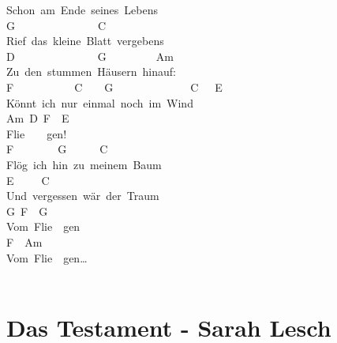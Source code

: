 \documentclass[]{book}
\let\stdsection\section
\renewcommand\section{\clearpage\stdsection}
\begin{document}
Schon~am~Ende~seines~Lebens\\
G~~~~~~~~~~~~~~~C\\
Rief~das~kleine~Blatt~vergebens\\
D~~~~~~~~~~~~~~~G~~~~~~~~~Am\\
Zu~den~stummen~Häusern~hinauf:\\
F~~~~~~~~~~~C~~~~G~~~~~~~~~~~~~~C~~~E\\
Könnt~ich~nur~einmal~noch~im~Wind\\
Am~D~F~~E\\
Flie~~~~gen!\\
F~~~~~~~~G~~~~~~C\\
Flög~ich~hin~zu~meinem~Baum\\
\hspace*{0.333em}\hspace*{0.333em}\hspace*{0.333em}\hspace*{0.333em}\hspace*{0.333em}\hspace*{0.333em}\hspace*{0.333em}\hspace*{0.333em}E~~~~~C\\
Und~vergessen~wär~der~Traum\\
\hspace*{0.333em}\hspace*{0.333em}\hspace*{0.333em}\hspace*{0.333em}\hspace*{0.333em}G~F~~G\\
Vom~Flie~~gen\\
\hspace*{0.333em}\hspace*{0.333em}\hspace*{0.333em}\hspace*{0.333em}\hspace*{0.333em}\hspace*{0.333em}\hspace*{0.333em}F~~Am\\
Vom~Flie~~gen\ldots{}\\
~\\

\hypertarget{das-testament---sarah-lesch}{%
\section{Das Testament - Sarah Lesch}\label{das-testament---sarah-lesch}}
\end{document}

